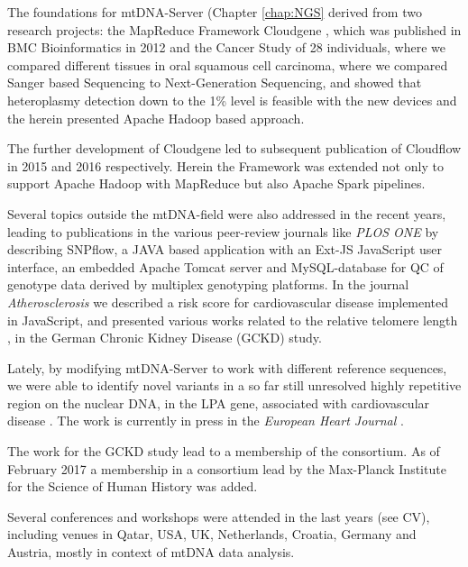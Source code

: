 The foundations for mtDNA-Server (Chapter \ref{chap:NGS} derived from two research projects: the MapReduce Framework Cloudgene \cite{Schonherr2012}, which was published in BMC Bioinformatics in 2012 and the Cancer Study of 28 individuals, where we compared different tissues in oral squamous cell carcinoma\cite{Kloss-Brandstatter2015}, where we compared Sanger based Sequencing to Next-Generation Sequencing, and showed that heteroplasmy detection down to the 1\% level is feasible with the new devices and the herein presented Apache Hadoop based approach. 

The further development of Cloudgene led to subsequent publication of Cloudflow in  2015 \cite{Forer2015} and 2016 \cite{Forer2016} respectively. Herein the Framework was extended not only to support Apache Hadoop with MapReduce but also Apache Spark pipelines. 

Several topics outside the mtDNA-field were also addressed in the recent years, leading to publications in the various peer-review journals like \textit{PLOS ONE} \cite{Weissensteiner2013} by describing SNPflow, a JAVA based application with an Ext-JS JavaScript user interface, an embedded Apache Tomcat server and MySQL-database for QC of genotype data derived by multiplex genotyping platforms. In the journal \textit{Atherosclerosis} we described a risk score for cardiovascular disease\cite{Lamina2014} implemented in JavaScript, and presented various works related to the relative telomere length \cite{Raschenberger2015assoc,Raschenberger2015dotelomeres}, in the German Chronic Kidney Disease (GCKD) study.

Lately, by modifying mtDNA-Server to work with different reference sequences, we were able to identify novel variants in a so far still unresolved highly repetitive region on the nuclear DNA, in the LPA gene, associated with cardiovascular disease \cite{Kronenberg2014}. The work is currently in press in the \textit{European Heart Journal} \cite{Coassin2017}. 


The work for the GCKD study lead to a membership of the consortium. As of February 2017 a membership in a consortium lead by the Max-Planck Institute for the Science of Human History was added.

Several conferences and workshops were attended in the last years (see CV), including venues in Qatar, USA, UK, Netherlands, Croatia, Germany and Austria, mostly in context of mtDNA data analysis. 


